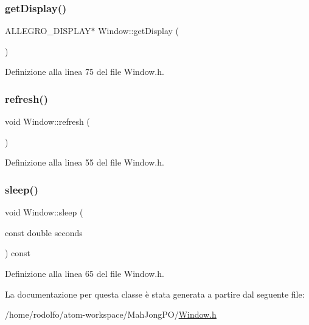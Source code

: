 \subsubsection{\texorpdfstring{get\+Display()}{getDisplay()}}
{\footnotesize\ttfamily A\+L\+L\+E\+G\+R\+O\+\_\+\+D\+I\+S\+P\+L\+AY$\ast$ Window\+::get\+Display (\begin{DoxyParamCaption}{ }\end{DoxyParamCaption})\hspace{0.3cm}{\ttfamily [inline]}}



Definizione alla linea 75 del file Window.\+h.

\mbox{\label{class_window_ad1a027c3630d4e1a6395bcf1f761e5d8}} 
\subsubsection{\texorpdfstring{refresh()}{refresh()}}
{\footnotesize\ttfamily void Window\+::refresh (\begin{DoxyParamCaption}{ }\end{DoxyParamCaption})\hspace{0.3cm}{\ttfamily [inline]}}



Definizione alla linea 55 del file Window.\+h.

\mbox{\label{class_window_a797362738ae0b3ff53009713f7060d86}} 
\subsubsection{\texorpdfstring{sleep()}{sleep()}}
{\footnotesize\ttfamily void Window\+::sleep (\begin{DoxyParamCaption}\item[{const double}]{seconds }\end{DoxyParamCaption}) const\hspace{0.3cm}{\ttfamily [inline]}}



Definizione alla linea 65 del file Window.\+h.



La documentazione per questa classe è stata generata a partire dal seguente file\+:\begin{DoxyCompactItemize}
\item 
/home/rodolfo/atom-\/workspace/\+Mah\+Jong\+P\+O/\hyperlink{_window_8h}{Window.\+h}\end{DoxyCompactItemize}
